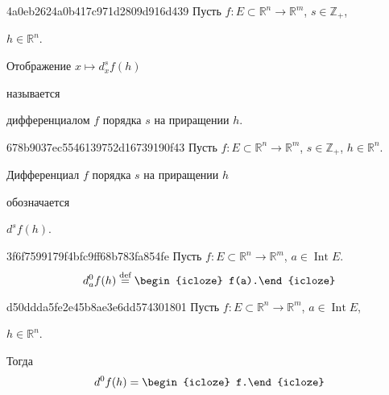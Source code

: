 \begin{note}{4a0eb2624a0b417c971d2809d916d439}
    Пусть \({ f : E \subset \mathbb R^{n} \to \mathbb R^{m} }\),\: \({ s \in \mathbb Z_+ }\),\: \begin{icloze}{3}\({ h \in \mathbb R^{n} }\).\end{icloze}
    \begin{icloze}{1}Отображение \({ x \mapsto d_{x}^{s}f(h) }\)\end{icloze} называется \begin{icloze}{2}дифференциалом \({ f }\) порядка \({ s }\) на приращении \({ h }\).\end{icloze}
\end{note}

\begin{note}{678b9037ec5546139752d16739190f43}
    Пусть \({ f : E \subset \mathbb R^{n} \to \mathbb R^{m} }\),\: \({ s \in \mathbb Z_+ }\),\: \({ h \in \mathbb R^{n} }\).
    \begin{icloze}{1}Дифференциал \({ f }\) порядка \({ s }\) на приращении \({ h }\)\end{icloze} обозначается \begin{icloze}{2}\({ d^{s}f(h) }\).\end{icloze}
\end{note}

\begin{note}{3f6f7599179f4bfc9ff68b783fa854fe}
    Пусть \({ f : E \subset \mathbb R^{n} \to \mathbb R^{m} }\),\: \({ a \in \operatorname{Int} E }\).
    \[
        d_{a}^{0}f(h) \overset{\text{def}}= \begin{icloze}{1}f(a).\end{icloze}
    \]
\end{note}

\begin{note}{d50ddda5fe2e45b8ae3e6dd574301801}
    Пусть \({ f : E \subset \mathbb R^{n} \to \mathbb R^{m} }\),\: \({ a \in \operatorname{Int} E }\),\: \begin{icloze}{2}\({ h \in \mathbb R^{n} }\).\end{icloze}
    Тогда
    \[
        d^{0}f(h) = \begin{icloze}{1}f.\end{icloze}
    \]
\end{note}

